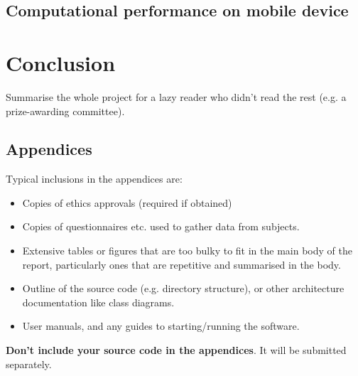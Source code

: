 \documentclass{l4proj}
\begin{document}
\section{Computational performance on mobile device}


\chapter{Conclusion}    
Summarise the whole project for a lazy reader who didn't read the rest (e.g. a prize-awarding committee).

%
% 

\begin{appendices}

\chapter{Appendices}

Typical inclusions in the appendices are:

\begin{itemize}
\item
  Copies of ethics approvals (required if obtained)
\item
  Copies of questionnaires etc. used to gather data from subjects.
\item
  Extensive tables or figures that are too bulky to fit in the main body of
  the report, particularly ones that are repetitive and summarised in the body.

\item Outline of the source code (e.g. directory structure), or other architecture documentation like class diagrams.

\item User manuals, and any guides to starting/running the software.

\end{itemize}

\textbf{Don't include your source code in the appendices}. It will be
submitted separately.

\end{appendices}






\end{document}
